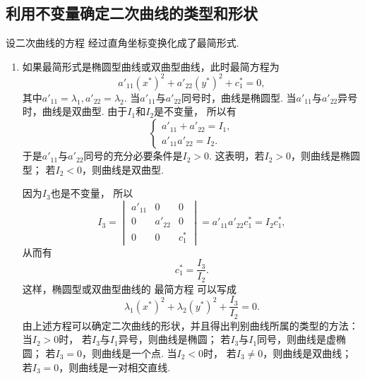 \subsection{利用不变量确定二次曲线的类型和形状}
设二次曲线的方程 
经过直角坐标变换化成了最简形式.
\begin{enumerate}
	\item 如果最简形式是椭圆型曲线或双曲型曲线，此时最简方程为\begin{equation*}
		a'_{11} (x^*)^2 + a'_{22} (y^*)^2 + c^*_1 = 0,
	\end{equation*}
	其中\(
		a'_{11} = \lambda_1,
		a'_{22} = \lambda_2
	\).
	当\(a'_{11}\)与\(a'_{22}\)同号时，曲线是椭圆型.
	当\(a'_{11}\)与\(a'_{22}\)异号时，曲线是双曲型.
	由于\(I_1\)和\(I_2\)是不变量，
	所以有\begin{equation*}
		\left\{ \begin{array}{l}
			a'_{11} + a'_{22} = I_1, \\
			a'_{11} a'_{22} = I_2.
		\end{array} \right.
	\end{equation*}
	于是\(a'_{11}\)与\(a'_{22}\)同号的充分必要条件是\(I_2 > 0\).
	这表明，若\(I_2 > 0\)，则曲线是椭圆型；
	若\(I_2 < 0\)，则曲线是双曲型.

	因为\(I_3\)也是不变量，
	所以\begin{equation*}
		I_3
		= \begin{vmatrix}
			a'_{11} & 0 & 0 \\
			0 & a'_{22} & 0 \\
			0 & 0 & c^*_1
		\end{vmatrix}
		= a'_{11} a'_{22} c^*_1
		= I_2 c^*_1,
	\end{equation*}
	从而有\begin{equation*}
		c^*_1 = \frac{I_3}{I_2}.
	\end{equation*}
	这样，椭圆型或双曲型曲线的
	最简方程 
	可以写成\begin{equation*}
		\lambda_1 (x^*)^2 + \lambda_2 (y^*)^2 + \frac{I_3}{I_2} = 0.
	\end{equation*}
	由上述方程可以确定二次曲线的形状，并且得出判别曲线所属的类型的方法：
	当\(I_2 > 0\)时，
		若\(I_3\)与\(I_1\)异号，则曲线是椭圆；
		若\(I_3\)与\(I_1\)同号，则曲线是虚椭圆；
		若\(I_3 = 0\)，则曲线是一个点.
	当\(I_2 < 0\)时，
		若\(I_3 \neq 0\)，则曲线是双曲线；
		若\(I_3 = 0\)，则曲线是一对相交直线.


\end{enumerate}
